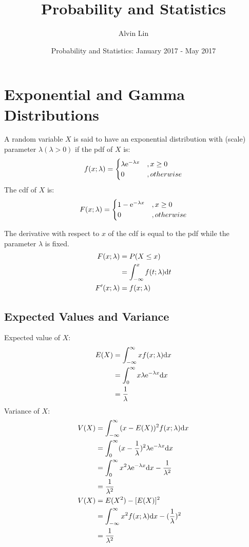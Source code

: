 \documentclass{math}
\title{Probability and Statistics}
\author{Alvin Lin}
\date{Probability and Statistics: January 2017 - May 2017}
\begin{document}
\maketitle

\section*{Exponential and Gamma Distributions}
A random variable \( X \) is said to have an exponential distribution with
(scale) parameter \( \lambda (\lambda>0) \) if the pdf of \( X \) is:
\[ f(x;\lambda) =
  \begin{cases}
    \lambda\mathrm{e}^{-\lambda x} &, x\geq 0 \\
    0 &, otherwise
  \end{cases}
\]
The cdf of \( X \) is:
\[ F(x;\lambda) =
  \begin{cases}
    1-\mathrm{e}^{-\lambda x} &, x\geq 0 \\
    0 &, otherwise
  \end{cases}
\]

The derivative with respect to \( x \) of the cdf is equal to the pdf while the
parameter \( \lambda \) is fixed.
\begin{align*}
  F(x;\lambda) &= P(X\leq x) \\
  &= \int_{-\infty}^{x}f(t;\lambda)\mathrm{d}{t} \\
  F'(x;\lambda) &= f(x;\lambda)
\end{align*}

\subsection*{Expected Values and Variance}
Expected value of \( X \):
\begin{align*}
  E(X) &= \int_{-\infty}^{\infty}xf(x;\lambda)\mathrm{d}{x} \\
  &= \int_{0}^{\infty}x\lambda\mathrm{e}^{-\lambda x}\mathrm{d}{x} \\
  &= \frac{1}{\lambda}
\end{align*}
Variance of \( X \):
\begin{align*}
  V(X) &= \int_{-\infty}^{\infty}(x-E(X))^{2}f(x;\lambda)\mathrm{d}{x} \\
  &= \int_{0}^{\infty}(x-\frac{1}{\lambda})^{2}\lambda\mathrm{e}^{-\lambda x}\mathrm{d}{x} \\
  &= \int_{0}^{\infty}x^{2}
    \lambda\mathrm{e}^{-\lambda x}\mathrm{d}{x}-\frac{1}{\lambda^{2}} \\
  &= \frac{1}{\lambda^{2}} \\
  V(X) &= E(X^{2})-[E(X)]^{2} \\
  &= \int_{-\infty}^{\infty}x^{2}f(x;\lambda)\mathrm{d}{x}-(\frac{1}{\lambda})^{2} \\
  &= \frac{1}{\lambda^{2}}
\end{align*}
\end{document}
